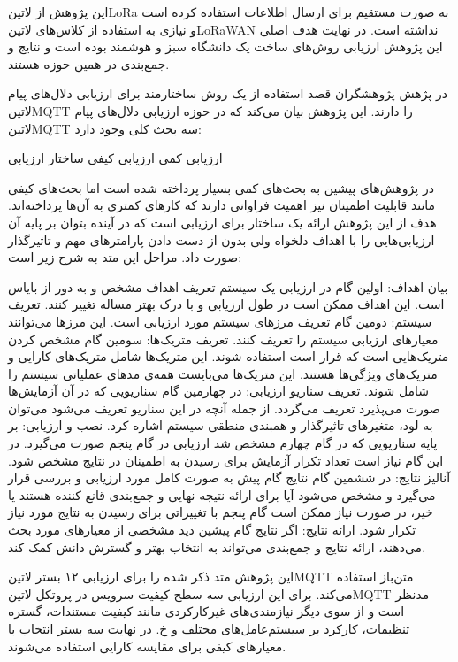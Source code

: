 این پژوهش از ‌لاتین{LoRa} به صورت مستقیم برای ارسال اطلاعات استفاده کرده است و نیازی به استفاده از کلاس‌های ‌لاتین{LoRaWAN} نداشته است.
در نهایت هدف اصلی این پژوهش ارزیابی روش‌های ساخت یک دانشگاه سبز و هوشمند بوده است و نتایج و جمع‌بندی در همین حوزه هستند.


در پژهش  پژوهشگران قصد استفاده از یک روش ساختارمند برای ارزیابی دلال‌های پیام ‌لاتین{MQTT} را دارند.
این پژوهش بیان می‌کند که در حوزه ارزیابی دلال‌های پیام ‌لاتین{MQTT} سه بحث کلی وجود دارد:

 ارزیابی کمی
 ارزیابی کیفی
 ساختار ارزیابی

در پژوهش‌های پیشین به بحث‌های کمی بسیار پرداخته شده است اما بحث‌های کیفی مانند قابلیت اطمینان نیز اهمیت فراوانی دارند
که کارهای کمتری به آن‌ها پرداخته‌اند. هدف از این پژوهش ارائه یک ساختار برای ارزیابی است که در آینده بتوان بر پایه آن ارزیابی‌هایی
را با اهداف دلخواه ولی بدون از دست دادن پارامترهای مهم و تاثیرگذار صورت داد. مراحل این متد به شرح زیر است:

 بیان اهداف: اولین گام در ارزیابی یک سیستم تعریف اهداف مشخص و به دور از بایاس است. این اهداف ممکن است
در طول ارزیابی و با درک بهتر مساله تغییر کنند.
 تعریف سیستم: دومین گام تعریف مرزهای سیستم مورد ارزیابی است. این مرزها می‌توانند معیارهای ارزیابی
سیستم را تعریف کنند.
 تعریف متریک‌ها: سومین گام مشخص کردن متریک‌هایی است که قرار است استفاده شوند. این متریک‌ها شامل
متریک‌های کارایی و متریک‌های ویژگی‌ها هستند. این متریک‌ها می‌بایست همه‌ی مدهای عملیاتی سیستم را شامل شوند.
 تعریف سناریو ارزیابی: در چهارمین گام سناریویی که در آن آزمایش‌ها صورت می‌پذیرد تعریف می‌گردد. از جمله آنچه در این سناریو تعریف می‌شود
می‌توان به لود، متغیرهای تاثیرگذار و همبندی منطقی سیستم اشاره کرد.
 نصب و ارزیابی: بر پایه سناریویی که در گام چهارم مشخص شد ارزیابی در گام پنجم صورت می‌گیرد. در این گام نیاز است تعداد تکرار آزمایش برای
رسیدن به اطمینان در نتایج مشخص شود.
 آنالیز نتایج: در ششمین گام نتایج گام پیش به صورت کامل مورد ارزیابی و بررسی قرار می‌گیرد و مشخص می‌شود آیا برای ارائه نتیجه نهایی و جمع‌بندی
قانع کننده هستند یا خیر، در صورت نیاز ممکن است گام پنجم با تغییراتی برای رسیدن به نتایج مورد نیاز تکرار شود.
 ارائه نتایج: اگر نتایج گام پیشین دید مشخصی از معیارهای مورد بحث می‌دهند، ارائه نتایج و جمع‌بندی می‌تواند به انتخاب بهتر و گسترش دانش کمک کند.

این پژوهش متد ذکر شده را برای ارزیابی ۱۲ بستر ‌لاتین{MQTT} متن‌باز استفاده می‌کند. برای این ارزیابی سه سطح کیفیت سرویس در پروتکل ‌لاتین{MQTT}
مدنظر است و از سوی دیگر نیازمندی‌های غیرکارکردی مانند کیفیت مستندات، گستره تنظیمات، کارکرد بر سیستم‌عامل‌های مختلف و ‌خ. در نهایت سه بستر انتخاب
با معیارهای کیفی برای مقایسه کارایی استفاده می‌شوند.

